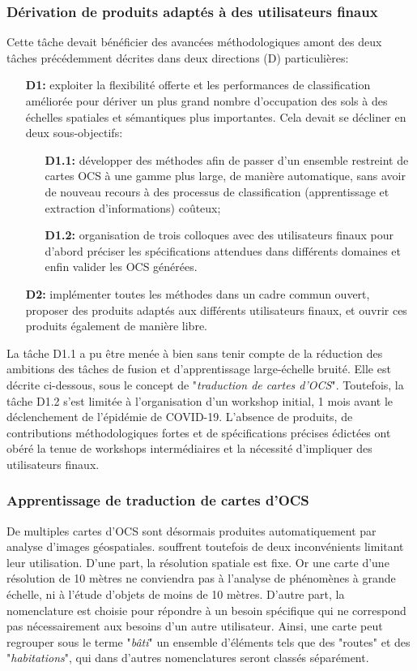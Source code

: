 \subsubsection{Dérivation de produits adaptés à des utilisateurs finaux}
Cette tâche devait bénéficier des avancées méthodologiques amont des deux tâches précédemment décrites dans deux directions (D) particulières:
\begin{itemize}
    \item[\textbf{D1:}] exploiter la flexibilité offerte et les performances de classification améliorée pour dériver un plus grand nombre d'occupation des sols à des échelles spatiales et sémantiques plus importantes. Cela devait se décliner en deux sous-objectifs:
    \begin{itemize}
        \item[\textbf{D1.1:}]  développer des méthodes afin de passer d'un ensemble restreint de cartes OCS à une gamme plus large, de manière automatique, sans avoir de nouveau recours à des processus de classification (apprentissage et extraction d'informations) coûteux;
        \item[\textbf{D1.2:}] organisation de trois colloques avec des utilisateurs finaux pour d'abord préciser les spécifications attendues dans différents domaines et enfin valider les OCS générées. 
    \end{itemize}
    \item[\textbf{D2:}] implémenter toutes les méthodes dans un cadre commun ouvert, proposer des produits adaptés aux différents utilisateurs finaux, et ouvrir ces produits également de manière libre.
\end{itemize}

La tâche D1.1 a pu être menée à bien sans tenir compte de la réduction des ambitions des tâches de fusion et d'apprentissage large-échelle bruité. Elle est décrite ci-dessous, sous le concept de "\textit{traduction de cartes d'OCS}". Toutefois, la tâche D1.2 s'est limitée à l'organisation d'un workshop initial, 1 mois avant le déclenchement de l'épidémie de COVID-19. L'absence de produits, de contributions méthodologiques fortes et de spécifications précises édictées ont obéré la tenue de workshops intermédiaires et la nécessité d'impliquer des utilisateurs finaux.

\subsubsection*{Apprentissage de traduction de cartes d'OCS}
De multiples cartes d'OCS sont désormais produites automatiquement par analyse d'images géospatiales. souffrent toutefois de deux inconvénients limitant leur utilisation. D'une part, la résolution spatiale est fixe. Or une carte d'une résolution de 10 mètres ne conviendra pas à l'analyse de phénomènes à grande échelle, ni à l'étude d'objets de moins de 10 mètres. D'autre part, la nomenclature est choisie pour répondre à un besoin spécifique qui ne correspond pas nécessairement aux besoins d'un autre utilisateur. Ainsi, une carte peut regrouper sous le terme "\textit{bâti}" un ensemble d'éléments tels que des "rout\textit{}es" et des "\textit{habitations}", qui dans d'autres nomenclatures seront classés séparément.
       
